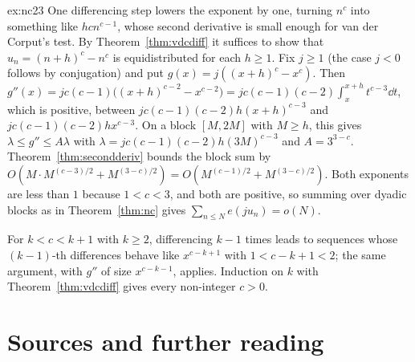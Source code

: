 \begin{solution}{ex:nc23}
\idea One differencing step lowers the exponent by one, turning $n^c$ into something like $hcn^{c-1}$, whose second derivative is small enough for van der Corput's test.
\writeup By Theorem~\ref{thm:vdcdiff} it suffices to show that $u_n=(n+h)^c-n^c$ is equidistributed for each $h\ge1$. Fix $j\ge1$ (the case $j<0$ follows by conjugation) and put $g(x)=j((x+h)^c-x^c)$. Then
$g''(x)=jc(c-1)\bigl((x+h)^{c-2}-x^{c-2}\bigr)=jc(c-1)(c-2)\int_x^{x+h}t^{c-3}\dd t$, which is positive, between $jc(c-1)(c-2)h(x+h)^{c-3}$ and $jc(c-1)(c-2)hx^{c-3}$. On a block $[M,2M]$ with $M\ge h$, this gives
$\lambda\le g''\le A\lambda$ with $\lambda=jc(c-1)(c-2)h(3M)^{c-3}$ and $A=3^{3-c}$. Theorem~\ref{thm:secondderiv} bounds the block sum by $O(M\cdot M^{(c-3)/2}+M^{(3-c)/2})=O(M^{(c-1)/2}+M^{(3-c)/2})$. Both exponents are less than $1$
because $1<c<3$, and both are positive, so summing over dyadic blocks as in Theorem~\ref{thm:nc} gives $\sum_{n\le N}e(ju_n)=o(N)$.

For $k<c<k+1$ with $k\ge2$, differencing $k-1$ times leads to sequences whose $(k-1)$-th differences behave like $x^{c-k+1}$ with $1<c-k+1<2$; the same argument, with $g''$ of size $x^{c-k-1}$, applies.
Induction on $k$ with Theorem~\ref{thm:vdcdiff} gives every non-integer $c>0$.
\end{solution}

\section*{Sources and further reading}

